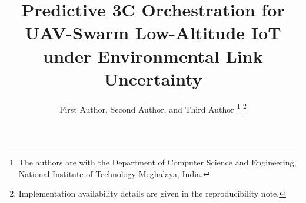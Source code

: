 \documentclass[journal]{IEEEtran}
\begin{document}
\title{Predictive 3C Orchestration for UAV-Swarm Low-Altitude IoT under Environmental Link Uncertainty}

\author{First Author, Second Author, and Third Author%
\thanks{The authors are with the Department of Computer Science and Engineering, National Institute of Technology Meghalaya, India.}%
\thanks{Implementation availability details are given in the reproducibility note.}%
}


\maketitle













\balance


\end{document}
